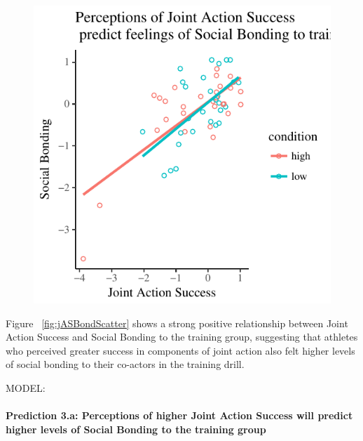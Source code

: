 \documentclass[english]{article}\usepackage[]{graphicx}\usepackage[]{color}
\makeatletter
\def\maxwidth{ %
  \ifdim\Gin@nat@width>\linewidth
    \linewidth
  \else
    \Gin@nat@width
  \fi
}
\newenvironment{knitrout}{}{} %
\newcommand{\myparagraph}[1]{\paragraph{#1}\mbox{}\\}
\makeatother
\begin{document}
\begin{knitrout}
\begin{figure}
{\centering \includegraphics[width=\maxwidth]{figure/jASBondScatter-1} 

}

\end{figure}


\end{knitrout}

Figure ~\ref{fig:jASBondScatter} shows a strong positive relationship between Joint Action Success and Social Bonding to the training group, suggesting that athletes who perceived greater success in components of joint action also felt higher levels of social bonding to their co-actors in the training drill.

MODEL:



\myparagraph{Prediction 3.a: Perceptions of higher Joint Action Success will predict higher levels of Social Bonding to the training group}
\end{document}
